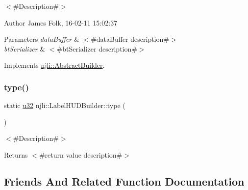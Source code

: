 $<$\#\+Description\#$>$ 

\begin{DoxyAuthor}{Author}
James Folk, 16-\/02-\/11 15\+:02\+:37
\end{DoxyAuthor}

\begin{DoxyParams}{Parameters}
{\em data\+Buffer} & $<$\#data\+Buffer description\#$>$ \\
\hline
{\em bt\+Serializer} & $<$\#bt\+Serializer description\#$>$ \\
\hline
\end{DoxyParams}


Implements \mbox{\hyperlink{classnjli_1_1_abstract_builder_ab66b774e02ccb9da554c9aab7fa6d981}{njli\+::\+Abstract\+Builder}}.

\mbox{\label{classnjli_1_1_label_h_u_d_builder_a2393097c6cfd7d456fb5af065ac68631}} 
\subsubsection{\texorpdfstring{type()}{type()}}
{\footnotesize\ttfamily static \mbox{\hyperlink{_util_8h_a10e94b422ef0c20dcdec20d31a1f5049}{u32}} njli\+::\+Label\+H\+U\+D\+Builder\+::type (\begin{DoxyParamCaption}{ }\end{DoxyParamCaption})\hspace{0.3cm}{\ttfamily [static]}}

$<$\#\+Description\#$>$

\begin{DoxyReturn}{Returns}
$<$\#return value description\#$>$ 
\end{DoxyReturn}


\subsection{Friends And Related Function Documentation}
\mbox{\label{classnjli_1_1_label_h_u_d_builder_acb96ebb09abe8f2a37a915a842babfac}} 
